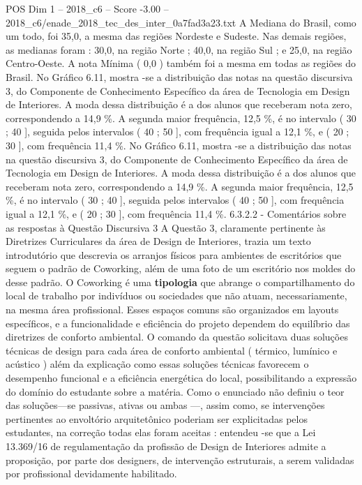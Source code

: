 \begin{textsample}{POS Dim 1 – 2018\_c6 – Score -3.00 – 2018\_c6/enade\_2018\_tec\_des\_inter\_0a7fad3a23.txt}
A Mediana do Brasil, como um todo, foi 35,0, a mesma das regiões Nordeste e Sudeste.
Nas demais regiões, as medianas foram : 30,0, na região Norte ; 40,0, na região Sul ; e 25,0, na região Centro-Oeste.
A nota Mínima ( 0,0 ) também foi a mesma em todas as regiões do Brasil.
No Gráfico 6.11, mostra -se a distribuição das notas na questão discursiva 3, do Componente de Conhecimento Específico da área de Tecnologia em Design de Interiores.
A moda dessa distribuição é a dos alunos que receberam nota zero, correspondendo a 14,9 \%.
A segunda maior frequência, 12,5 \%, é no intervalo ( 30 ; 40 ], seguida pelos intervalos ( 40 ; 50 ], com frequência igual a 12,1 \%, e ( 20 ; 30 ], com frequência 11,4 \%.
No Gráfico 6.11, mostra -se a distribuição das notas na questão discursiva 3, do Componente de Conhecimento Específico da área de Tecnologia em Design de Interiores.
A moda dessa distribuição é a dos alunos que receberam nota zero, correspondendo a 14,9 \%.
A segunda maior frequência, 12,5 \%, é no intervalo ( 30 ; 40 ], seguida pelos intervalos ( 40 ; 50 ], com frequência igual a 12,1 \%, e ( 20 ; 30 ], com frequência 11,4 \%. 6.3.2.2 - Comentários sobre as respostas à Questão Discursiva 3 A Questão 3, claramente pertinente às Diretrizes Curriculares da área de Design de Interiores, trazia um texto introdutório que descrevia os arranjos físicos para ambientes de escritórios que seguem o padrão de Coworking, além de uma foto de um escritório nos moldes do desse padrão.
O Coworking é uma \textbf{tipologia} que abrange o compartilhamento do local de trabalho por indivíduos ou sociedades que não atuam, necessariamente, na mesma área profissional.
Esses espaços comuns são organizados em layouts específicos, e a funcionalidade e eficiência do projeto dependem do equilíbrio das diretrizes de conforto ambiental.
O comando da questão solicitava duas soluções técnicas de design para cada área de conforto ambiental ( térmico, lumínico e acústico ) além da explicação como essas soluções técnicas favorecem o desempenho funcional e a eficiência energética do local, possibilitando a expressão do domínio do estudante sobre a matéria.
Como o enunciado não definiu o teor das soluções—se passivas, ativas ou ambas —, assim como, se intervenções pertinentes ao envoltório arquitetônico poderiam ser explicitadas pelos estudantes, na correção todas elas foram aceitas : entendeu -se que a Lei 13.369/16 de regulamentação da profissão de Design de Interiores admite a proposição, por parte dos designers, de intervenção estruturais, a serem validadas por profissional devidamente habilitado.

\end{textsample}
